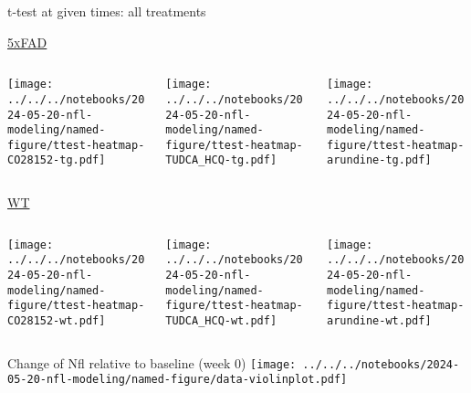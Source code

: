 \documentclass[aspectratio=169]{beamer}
\begin{document}
\begin{frame}{t-test at given times: all treatments}

\uline{\textsc{5xFAD}\hfill}

\begin{columns}[t]
\begin{column}{0.33\textwidth}

  \texttt{[image: ../../../notebooks/2024-05-20-nfl-modeling/named-figure/ttest-heatmap-CO28152-tg.pdf]}
\end{column}

\begin{column}{0.33\textwidth}

  \texttt{[image: ../../../notebooks/2024-05-20-nfl-modeling/named-figure/ttest-heatmap-TUDCA\_HCQ-tg.pdf]}
\end{column}

\begin{column}{0.33\textwidth}

  \texttt{[image: ../../../notebooks/2024-05-20-nfl-modeling/named-figure/ttest-heatmap-arundine-tg.pdf]}
\end{column}
\end{columns}

\uline{\textsc{WT}\hfill}

\begin{columns}[t]
\begin{column}{0.33\textwidth}

  \texttt{[image: ../../../notebooks/2024-05-20-nfl-modeling/named-figure/ttest-heatmap-CO28152-wt.pdf]}
\end{column}

\begin{column}{0.33\textwidth}

  \texttt{[image: ../../../notebooks/2024-05-20-nfl-modeling/named-figure/ttest-heatmap-TUDCA\_HCQ-wt.pdf]}
\end{column}

\begin{column}{0.33\textwidth}

  \texttt{[image: ../../../notebooks/2024-05-20-nfl-modeling/named-figure/ttest-heatmap-arundine-wt.pdf]}
\end{column}
\end{columns}
\end{frame}

\begin{frame}{Change of Nfl relative to baseline (week 0)}
  \texttt{[image: ../../../notebooks/2024-05-20-nfl-modeling/named-figure/data-violinplot.pdf]}
\end{frame}
\end{document}
